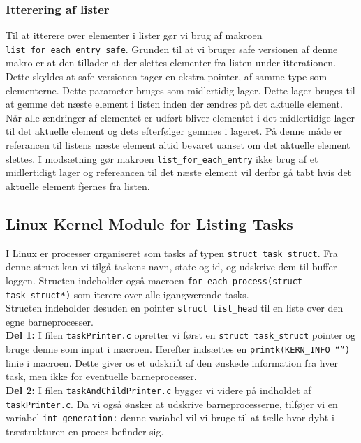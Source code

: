 \documentclass[main.tex]{subfile}
\begin{document}
\subsubsection*{Itterering af lister}
Til at itterere over elementer i lister gør vi brug af makroen \texttt{list\_for\_each\_entry\_safe}. Grunden til at vi bruger safe versionen af denne makro er at den tillader at der slettes elementer fra listen under itterationen. Dette skyldes at safe versionen tager en ekstra pointer, af samme type som elementerne. Dette parameter bruges som midlertidig lager. Dette lager bruges til at gemme det næste element i listen inden der ændres på det aktuelle element. Når alle ændringer af elementet er udført bliver elementet i det midlertidige lager til det aktuelle element og dets efterfølger gemmes i lageret. På denne måde er referancen til listens næste element altid bevaret uanset om det aktuelle element slettes. I modsætning gør makroen \texttt{list\_for\_each\_entry} ikke brug af et midlertidigt lager og refereancen til det næste element vil derfor gå tabt hvis det aktuelle element fjernes fra listen.

\subsection{Linux Kernel Module for Listing Tasks}
I Linux er processer organiseret som tasks af typen \texttt{struct task\_struct}. Fra denne struct kan vi tilgå taskens navn, state og id, og udskrive dem til buffer loggen. Structen indeholder også macroen \texttt{for\_each\_process(struct task\_struct*)} som iterere over alle igangværende tasks.\\

Structen indeholder desuden en pointer \texttt{struct list\_head} til en liste over den egne barneprocesser.\\

\textbf{Del 1:} I filen \texttt{taskPrinter.c} opretter vi først en \texttt{struct task\_struct} pointer og bruge denne som input i macroen. Herefter indsættes en \texttt{printk(KERN\_INFO “”)} linie i macroen. Dette giver os et udskrift af den ønskede information fra hver task, men ikke for eventuelle barneprocesser.\\

\textbf{Del 2:} I filen \texttt{taskAndChildPrinter.c} bygger vi videre på indholdet af \texttt{taskPrinter.c}. Da vi også ønsker at udskrive barneprocesserne, tilføjer vi en variabel \texttt{int generation:} denne variabel vil vi bruge til at tælle hvor dybt i træstrukturen en proces befinder sig.\\
\end{document}
